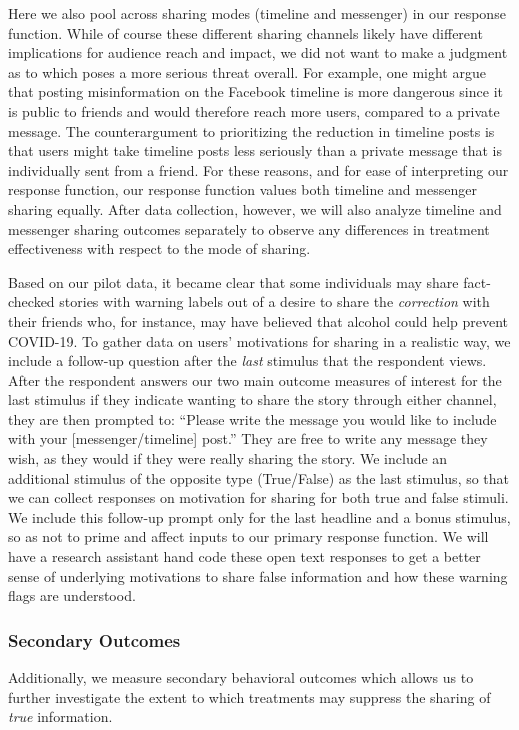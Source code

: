 \documentclass[letterpaper, 12pt, parskip=full,DIV=10]{scrartcl}
\begin{document}
{Here we also pool across sharing modes (timeline and messenger) in our response function. While of course these different sharing channels likely have different implications for audience reach and impact, we did not want to make a judgment as to which poses a more serious threat overall. For example, one might argue that posting misinformation on the Facebook timeline is more dangerous since it is public to friends and would therefore reach more users, compared to a private message. The counterargument to prioritizing the reduction in timeline posts is that users might take timeline posts less seriously than a private message that is individually sent from a friend. For these reasons, and for ease of interpreting our response function, our response function values both timeline and messenger sharing equally. After data collection, however, we will also analyze timeline and messenger sharing outcomes separately to observe any differences in treatment effectiveness with respect to the mode of sharing.
}

{Based on our pilot data, it became clear that some individuals may share fact-checked stories with warning labels out of a desire to share the \textit{correction} with their friends who, for instance, may have believed that alcohol could help prevent COVID-19. To gather data on users' motivations for sharing in a realistic way, we include a follow-up question after the \textit{last} stimulus that the respondent views. After the respondent answers our two main outcome measures of interest for the last stimulus if they indicate wanting to share the story through either channel, they are then prompted to: ``Please write the message you would like to include with your [messenger/timeline] post.'' They are free to write any message they wish, as they would if they were really sharing the story. We include an additional stimulus of the opposite type (True/False) as the last stimulus, so that we can collect responses on motivation for sharing for both true and false stimuli. We include this follow-up prompt only for the last headline and a bonus stimulus, so as not to prime and affect inputs to our primary response function. We will have a research assistant hand code these open text responses to get a better sense of underlying motivations to share false information and how these warning flags are understood. 
} 


\subsubsection{Secondary Outcomes}
Additionally, we measure secondary behavioral outcomes which allows us to further investigate the extent to which treatments may suppress the sharing of \textit{true} information.
\end{document}
